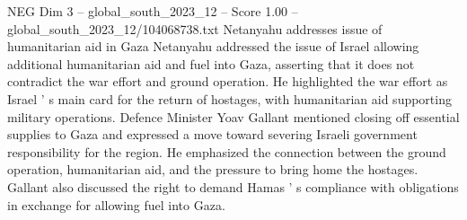 \begin{textsample}{NEG Dim 3 – global\_south\_2023\_12 – Score 1.00 – global\_south\_2023\_12/104068738.txt}
Netanyahu addresses issue of humanitarian aid in Gaza Netanyahu addressed the issue of Israel allowing additional humanitarian aid and fuel into Gaza, asserting that it does not contradict the war effort and ground operation.
He highlighted the war effort as Israel ' s main card for the return of hostages, with humanitarian aid supporting military operations.
Defence Minister Yoav Gallant mentioned closing off essential supplies to Gaza and expressed a move toward severing Israeli government responsibility for the region.
He emphasized the connection between the ground operation, humanitarian aid, and the pressure to bring home the hostages.
Gallant also discussed the right to demand Hamas ' s compliance with obligations in exchange for allowing fuel into Gaza.

\end{textsample}
